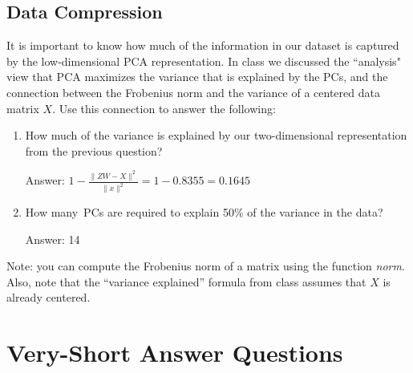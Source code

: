 \documentclass{article}
\def\ans#1{\par\gre{Answer: #1}}
\def\blu#1{{\color{blu}#1}}
\def\gre#1{{\color{gre}#1}}
\def\enum#1{\begin{enumerate}#1\end{enumerate}}
\begin{document}
\subsection{Data Compression}

It is important to know how much of the information in our dataset is captured by the low-dimensional PCA representation.
In class we discussed the ``analysis" view that PCA maximizes the variance that is explained by the PCs, and the connection between the Frobenius norm and the variance of a centered data matrix $X$. Use this connection to answer the following:
\blu{\enum{
\item How much of the variance is explained by our two-dimensional representation from the previous question?
\ans{$1 - \frac {\|ZW - X\|^2} {\|x\|^2} = 1 - 0.8355 = 0.1645$} 
\item How many\ PCs are required to explain 50\% of the variance in the data?
\ans{14}
}}
Note: you can compute the Frobenius norm of a matrix using the function \emph{norm}. Also, note that the ``variance explained'' formula from class assumes that $X$ is already centered.



\section{Very-Short Answer Questions}
\end{document}
